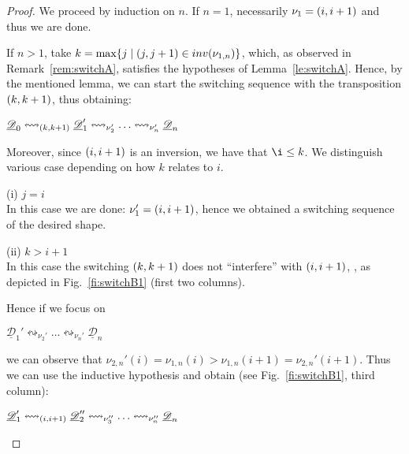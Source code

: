 \documentclass[a4paper,UKenglish,cleveref,pdftex, thm-restate,numberwithinsect,anonymous]{lipics}
\newcommand{\dder}[1]{\mathscr{#1}}
\newcommand{\der}[1]{\underline{\dder{#1}}}
\newcommand{\inv}[1]{\mathsf{inv}({#1})}
\newcommand{\shift}[1]{\ensuremath{\mathrel{{\leftrightsquigarrow}_{#1}}}}
\begin{document}
\begin{proof}
  We proceed by induction on $n$. If $n=1$, necessarily
  $\nu_1 =  \transp{i}$ and thus we are done.

  If $n>1$, take $k = \max \{j \mid \transp{j} \in \inv{\nu_{1,n}}\}$, which,
  as observed in Remark~\ref{rem:switchA}, satisfies the hypotheses of
  Lemma~\ref{le:switchA}. Hence, by the mentioned lemma, we can start
  the switching sequence with the transposition $\transp{k}$, thus
  obtaining:
  \begin{center}
    $\der{D}_0 \shift{\transp{k}} \der{D}_1' \shift{\nu_2'} \ldots
    \shift{\nu_n'} \der{D}_n$
  \end{center}

  Moreover, since $\transp{i}$ is an inversion, we have that
  $\i \leq k$.  We distinguish various case depending on how $k$
  relates to $i$.

  \bigskip
  \noindent
  (i) $j=i$\\
  In this case we are done: $\nu_1' = \transp{i}$, hence we obtained a
  switching sequence of the desired shape.

  \bigskip
  \noindent
  (ii) $k > i+1$\\
  In this case the switching $\transp{k}$ does not ``interfere'' with
  $\transp{i}$, , as depicted in Fig.~\ref{fi:switchB1} (first two
  columns).

  Hence if we focus on
  \begin{center}
    $\der{D}_1' \shift{\nu_2'} \ldots
    \shift{\nu_n'} \der{D}_n$
  \end{center}
  we can observe that
  $\nu_{2,n}'(i)=\nu_{1,n}(i) > \nu_{1,n}(i+1)=\nu_{2,n}'(i+1)$.
  Thus we can use the inductive hypothesis and obtain (see
  Fig.~\ref{fi:switchB1}, third column):
  \begin{center}
    $\der{D}_1' \shift{\transp{i}} \der{D}_2'' \shift{\nu_3''} \ldots
    \shift{\nu_n''} \der{D}_n$
  \end{center}

\begin{figure}
  \centering
\end{figure}
\end{proof}
\end{document}
